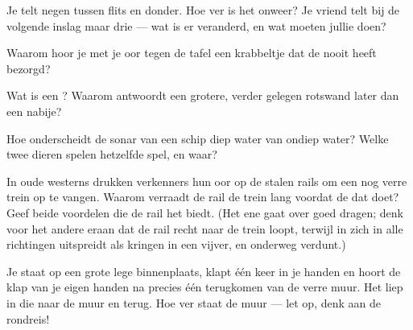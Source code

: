 \begin{exercise}[$\star$]\label{exo:g4:how-sound-travels:6}
Je telt negen  tussen flits en donder. Hoe ver is het onweer?
Je vriend telt bij de volgende inslag maar drie  --- wat is er
veranderd, en wat moeten jullie doen?
\end{exercise}

\begin{exercise}[$\star$]\label{exo:g4:how-sound-travels:7}
Waarom hoor je met je oor tegen de tafel een krabbeltje dat de
 nooit heeft bezorgd?
\end{exercise}

\begin{exercise}[$\star$]\label{exo:g4:how-sound-travels:8}
Wat is een ? Waarom antwoordt een grotere, verder gelegen rotswand
later dan een nabije?
\end{exercise}

\begin{exercise}[$\star$]\label{exo:g4:how-sound-travels:9}
Hoe onderscheidt de sonar van een schip diep water van ondiep water?
Welke twee dieren spelen hetzelfde spel, en waar?
\end{exercise}

\begin{exercise}[$\star\star$]\label{exo:g4:how-sound-travels:10}
In oude westerns drukken verkenners hun oor op de stalen rails om een
nog verre trein op te vangen. Waarom verraadt de rail de trein lang
voordat de  dat doet? Geef beide voordelen die de rail het
 biedt. (Het ene gaat over goed dragen; denk voor het andere
eraan dat de rail recht naar de trein loopt, terwijl  in
 zich in alle richtingen uitspreidt als kringen in een vijver, en
onderweg verdunt.)
\end{exercise}

\begin{exercise}[$\star\star$]\label{exo:g4:how-sound-travels:11}
Je staat op een grote lege binnenplaats, klapt één keer in je handen
en hoort de klap van je eigen handen na precies één 
terugkomen van de verre muur. Het  liep in die  naar de
muur en terug. Hoe ver staat de muur --- let op, denk aan de
rondreis!
\end{exercise}
